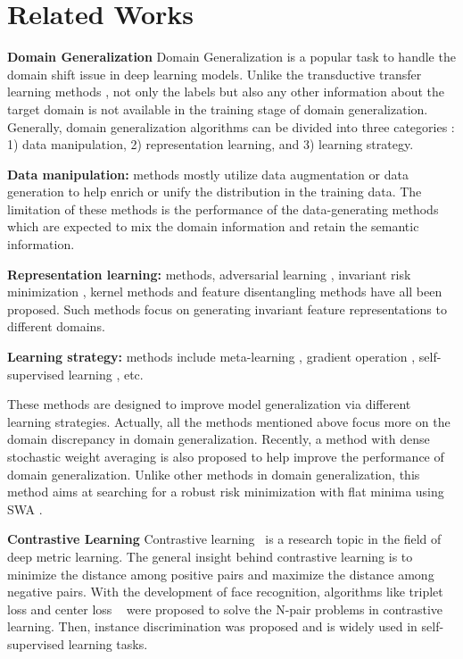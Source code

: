 \documentclass[a4paper,fleqn]{cas-dc}
\begin{document}
 \section{Related Works}
\label{sec: Related Works}
\textbf{Domain Generalization}
 Domain Generalization is a popular task to handle the domain shift issue in deep learning models. Unlike the transductive transfer learning methods \cite{pan}, not only the labels but also any other information about the target domain is not available in the training stage of domain generalization. Generally, domain generalization algorithms can be divided into three categories \cite{dgsurvey}: 1) data manipulation, 2) representation learning, and 3) learning strategy.

  \noindent \textbf{Data manipulation:} methods \cite{crossgrad,mixstyle} mostly utilize data augmentation or data generation to help enrich or unify the distribution in the training data. The limitation of these methods is the performance of the data-generating methods which are expected to mix the domain information and retain the semantic information.
  
 \noindent \textbf{Representation learning:} methods, adversarial learning \cite{adv1,adv2}, invariant risk minimization \cite{IRM}, kernel methods \cite{DMA, mmd} and feature disentangling methods \cite{DG-net-PP}  have all been proposed. Such methods focus on generating invariant feature representations to different domains.
 
\noindent \textbf{Learning strategy:} methods include meta-learning \cite{steam,selfbalance}, gradient operation \cite{rsc,fishr}, self-supervised learning \cite{selfreg}, etc. 

   
These methods are designed to improve model generalization via different learning strategies. Actually, all the methods mentioned above focus more on the domain discrepancy in domain generalization. Recently, a method with dense stochastic weight
averaging \cite{swad} is also proposed to help improve the performance of domain generalization. Unlike other methods in domain generalization, this method aims at searching for a robust risk minimization with flat minima using SWA \cite{swa}.  \par

\textbf{Contrastive Learning} 
Contrastive learning~\cite{contrastiveloss} is a research topic in the field of deep metric learning. The general insight behind contrastive learning is to minimize the distance among positive pairs and maximize the distance among negative pairs. With the development of face recognition, algorithms like triplet loss \cite{tripletloss} and center loss ~\cite{centerloss} were proposed to solve the N-pair problems in contrastive learning. Then, instance discrimination\cite{instancediscrimination} was proposed and is widely used in self-supervised learning tasks.  
\end{document}
